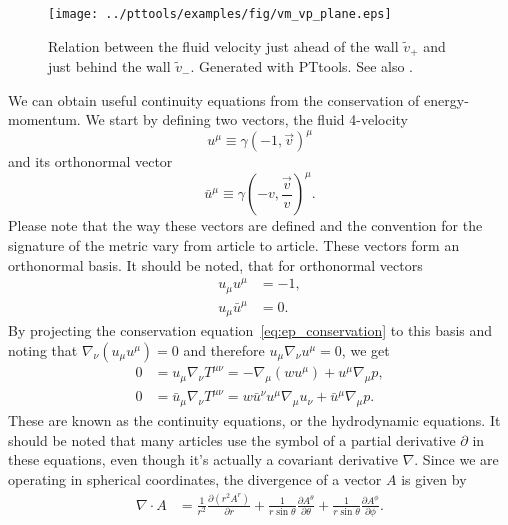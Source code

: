 \begin{figure}[h!]
\centering
\texttt{[image: ../pttools/examples/fig/vm\_vp\_plane.eps]}
\caption{Relation between the fluid velocity just ahead of the wall $\tilde{v}_+$ and just behind the wall $\tilde{v}_-$. Generated with PTtools. See also \cite[fig. 13]{lecture_notes}.}
\label{fig:vplus_vminus}
\end{figure}

We can obtain useful continuity equations from the conservation of energy-momentum.
We start by defining two vectors, the fluid 4-velocity
\begin{equation}
u^\mu \equiv \gamma(-1, \overrightarrow{v})^\mu
\label{eq:u_mu}
\end{equation}
and its orthonormal vector
\begin{equation}
\bar{u}^\mu \equiv \gamma(-v, \frac{\overrightarrow{v}}{v})^\mu.
\end{equation}
Please note that the way these vectors are defined and the convention for the signature of the metric vary
from article to article.
These vectors form an orthonormal basis.
It should be noted, that for orthonormal vectors
\begin{align}
u_\mu u^\mu &= -1, \\
u_\mu \bar{u}^\mu &= 0.
\end{align}
By projecting the conservation equation~\eqref{eq:ep_conservation} to this basis and noting that
$\nabla_\nu (u_\mu u^\mu) = 0$ and therefore $u_\mu \nabla_\nu u^\mu = 0$, we get
\cite[eq. 7.28-7.29]{lecture_notes}
\begin{align}
0 &= u_\mu \nabla_\nu T^{\mu \nu} = -\nabla_\mu (w u^\mu) + u^\mu \nabla_\mu p,
\label{eq:continuity1} \\
0 &= \bar{u}_\mu \nabla_\nu T^{\mu \nu} = w \bar{u}^\nu u^\mu \nabla_\mu u_\nu + \bar{u}^\mu \nabla_\mu p.
\label{eq:continuity2}
\end{align}
These are known as the continuity equations, or the hydrodynamic equations.
It should be noted that many articles use the symbol of a partial derivative $\partial$ in these equations,
even though it's actually a covariant derivative $\nabla$.
Since we are operating in spherical coordinates,
the divergence of a vector $A$ is given by
\begin{align}
\nabla \cdot A
&= \frac{1}{r^2} \frac{\partial (r^2 A^r)}{\partial r}
+ \frac{1}{r \sin \theta} \frac{\partial A^\theta}{\partial \theta}
+ \frac{1}{r \sin \theta} \frac{\partial A^\phi}{\partial \phi}.
\label{eq:divergence}
\end{align}
